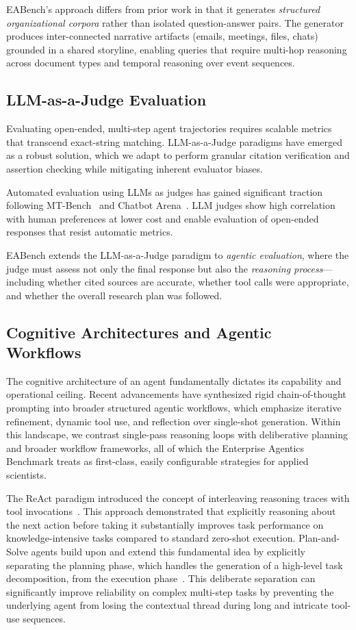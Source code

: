 \documentclass[journal,dvipsnames]{acmart}
\begin{document}
EABench's approach differs from prior work in that it generates
\emph{structured organizational corpora} rather than isolated question-answer
pairs.  The generator produces inter-connected narrative artifacts (emails,
meetings, files, chats) grounded in a shared storyline, enabling queries that
require multi-hop reasoning across document types and temporal reasoning over
event sequences.

\subsection{LLM-as-a-Judge Evaluation}

Evaluating open-ended, multi-step agent trajectories requires scalable metrics that transcend exact-string matching. LLM-as-a-Judge paradigms have emerged as a robust solution, which we adapt to perform granular citation verification and assertion checking while mitigating inherent evaluator biases.

Automated evaluation using LLMs as judges has gained significant traction following MT-Bench~\cite{zheng2023judging} and Chatbot Arena~\cite{chiang2024chatbot}. LLM judges show high correlation with human
preferences at lower cost and enable evaluation of open-ended responses that
resist automatic metrics.

EABench extends the LLM-as-a-Judge paradigm to \emph{agentic evaluation},
where the judge must assess not only the final response but also the
\emph{reasoning process}---including whether cited sources are accurate,
whether tool calls were appropriate, and whether the overall research plan was
followed.

\subsection{Cognitive Architectures and Agentic Workflows}

The cognitive architecture of an agent fundamentally dictates its capability and operational ceiling. Recent advancements have synthesized rigid chain-of-thought prompting into broader structured agentic workflows, which emphasize iterative refinement, dynamic tool use, and reflection over single-shot generation. Within this landscape, we contrast single-pass reasoning loops with deliberative planning and broader workflow frameworks, all of which the Enterprise Agentics Benchmark treats as first-class, easily configurable strategies for applied scientists.

The ReAct paradigm introduced the concept of interleaving reasoning traces with tool invocations~\cite{yao2022react}. This approach demonstrated that explicitly reasoning about the next action before taking it substantially improves task performance on knowledge-intensive tasks compared to standard zero-shot execution. Plan-and-Solve agents build upon and extend this fundamental idea by explicitly separating the planning phase, which handles the generation of a high-level task decomposition, from the execution phase~\cite{wang2023plansolve}. This deliberate separation can significantly improve reliability on complex multi-step tasks by preventing the underlying agent from losing the contextual thread during long and intricate tool-use sequences.
\end{document}
